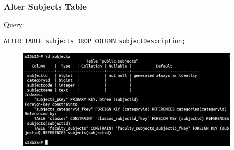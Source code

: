 \documentclass{article}
\begin{document}
\subsubsection*{Alter Subjects Table}
Query:
\begin{Verbatim}[frame=single,framerule=1pt,fontfamily=courier,fontsize=\small]
ALTER TABLE subjects DROP COLUMN subjectDescription;
\end{Verbatim}
\begin{figure}[h]
    \centering
    \includegraphics[width=\textwidth]{./o_15_alter_subjects.png}
\end{figure}
\end{document}
